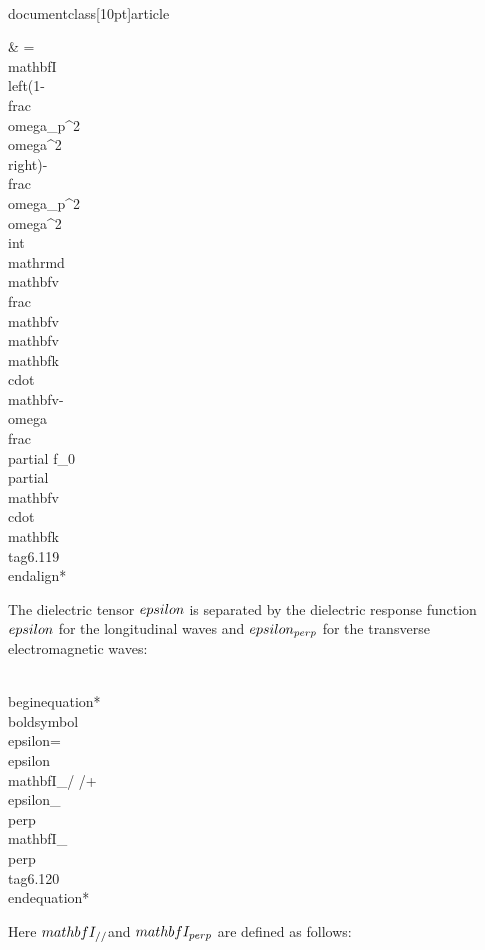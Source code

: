 \\documentclass[10pt]{article}
\begin{document}
{{{{& =\\mathbf{I}\\left(1-\\frac{\\omega_{p}^{2}}{\\omega^{2}}\\right)-\\frac{\\omega_{p}^{2}}{\\omega^{2}} \\int \\mathrm{d} \\mathbf{v} \\frac{\\mathbf{v} \\mathbf{v}}{\\mathbf{k} \\cdot \\mathbf{v}-\\omega} \\frac{\\partial f_{0}}{\\partial \\mathbf{v}} \\cdot \\mathbf{k} \\tag{6.119}
\\end{align*}


The dielectric tensor $\\epsilon$ is separated by the dielectric response function $\\epsilon$ for the longitudinal waves and $\\epsilon_{\\perp}$ for the transverse electromagnetic waves:


\\begin{equation*}
\\boldsymbol{\\epsilon}=\\epsilon \\mathbf{I}_{/ /}+\\epsilon_{\\perp} \\mathbf{I}_{\\perp} \\tag{6.120}
\\end{equation*}


Here $\\mathbf{I}_{/ /}$and $\\mathbf{I}_{\\perp}$ are defined as follows:


}}}}
\end{document}

